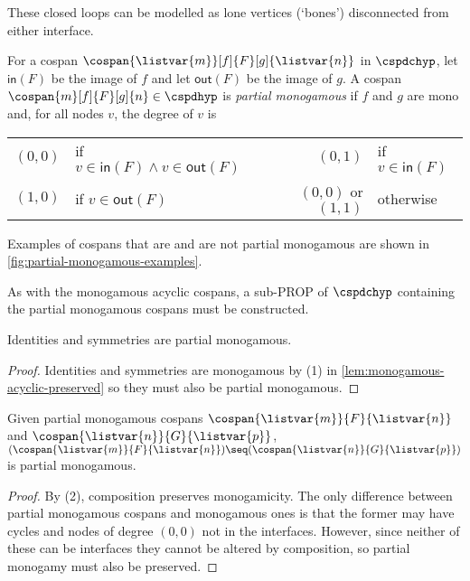 These closed loops can be modelled as lone vertices (`bones') disconnected from
either interface.

\begin{definition}
    For a cospan \(\cospan{\listvar{m}}[f]{F}[g]{\listvar{n}}\) in
    \(\cspdchyp\), let \(\mathsf{in}(F)\) be the image of \(f\) and let
    \(\mathsf{out}(F)\) be the image of \(g\).
    A cospan \(\cospan{m}[f]{F}[g]{n} \in \cspdhyp\) is
    \emph{partial monogamous} if \(f\) and \(g\) are mono and, for all nodes
    \(v\), the degree of \(v\) is
    \begin{center}
        \begin{tabular}{rlcrl}
            \((0,0)\)
            &
            if \(v \in \mathsf{in}(F) \wedge v \in \mathsf{out}(F)\)
            &
            \quad
            &
            \((0,1)\)
            &
            if \(v \in \mathsf{in}(F)\)
            \\
            \((1,0)\)
            &
            if \(v \in \mathsf{out}(F)\)
            &
            \quad
            &
            \((0,0)\)
            or \((1,1)\)
            &
            otherwise
        \end{tabular}
    \end{center}
\end{definition}



\begin{example}
    Examples of cospans that are and are not partial monogamous are shown
    in \cref{fig:partial-monogamous-examples}.
\end{example}

As with the monogamous acyclic cospans, a sub-PROP of \(\cspdchyp\) containing
the partial monogamous cospans must be constructed.

\begin{lemma}
    Identities and symmetries are partial monogamous.
\end{lemma}
\begin{proof}
    Identities and symmetries are monogamous by (1) in
    \cref{lem:monogamous-acyclic-preserved} so they must also be partial
    monogamous.
\end{proof}

\begin{lemma}
    Given partial monogamous cospans \(\cospan{\listvar{m}}{F}{\listvar{n}}\)
    and \(\cospan{\listvar{n}}{G}{\listvar{p}}\), \(
        (\cospan{\listvar{m}}{F}{\listvar{n}})
        \seq
        (\cospan{\listvar{n}}{G}{\listvar{p}})
    \) is partial monogamous.
\end{lemma}
\begin{proof}
    By (2), composition preserves monogamicity.
    The only difference between partial monogamous cospans and monogamous ones
    is that the former may have cycles and nodes of degree \((0,0)\) not in the
    interfaces.
    However, since neither of these can be interfaces they cannot be altered by
    composition, so partial monogamy must also be preserved.
\end{proof}

